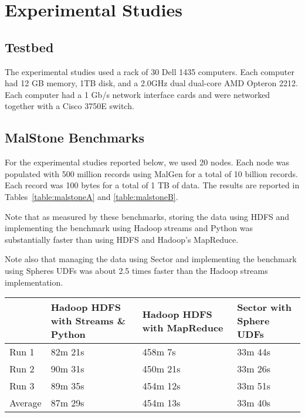 \documentclass{acm_proc_article-sp}
\def\malstone{MalStone } \def\malgen{MalGen }
\begin{document}
\section{Experimental Studies}
\label{section:experiments}

\subsection{Testbed}


The experimental studies used a rack of 30 Dell 1435 computers.
Each computer had 12 GB memory, 1TB disk, and a 
2.0GHz dual dual-core AMD Opteron 2212.  Each computer 
had a 1 Gb/s network interface cards and were networked together
with a Cisco 3750E switch.



\subsection{\malstone Benchmarks}

For the experimental studies reported below, we used 20 nodes. Each
node was populated with 500 million records using \malgen for a total
of 10 billion records.  Each record was 100 bytes for a total of 1 TB
of data.  The results are reported in Tables~\ref{table:malstoneA} and
\ref{table:malstoneB}.

Note that as measured by these benchmarks, storing the data using HDFS and 
implementing the benchmark using Hadoop streams and Python was substantially
faster than using HDFS and Hadoop's MapReduce.

Note also that managing the data using Sector and implementing the
benchmark using Spheres UDFs was about 2.5 times faster than the
Hadoop streams implementation.


\begin{table*}
\begin{center}
\begin{tabular}{|p{1.0in}|p{1.0in}|p{1.0in}|p{1.0in}|} \hline
& {\bf Hadoop HDFS with Streams \& Python} & 
{\bf Hadoop HDFS with MapReduce} & {\bf Sector with 
Sphere UDFs} \\ \hline
Run 1 & 
	82m 21s & 
	458m 7s & 
	33m 44s \\ \hline
Run 2 & 
	90m 31s & 
	450m 21s & 
	33m 26s \\ \hline
Run 3 & 
	89m 35s & 
	454m 12s & 
	33m 51s \\ \hline
Average	 & 
        87m 29s & 
	454m 13s & 
	33m 40s \\ \hline
\end{tabular}
\end{center}
\caption{This table summarizes an experimental study
running \malstone A on 20 nodes.  Each node had 500 million 100-byte
\malstone records.  The tests used version 0.18.3 of Hadoop
and version 1.20 of Sector.}
\label{table:malstoneA}
\end{table*}
\end{document}
